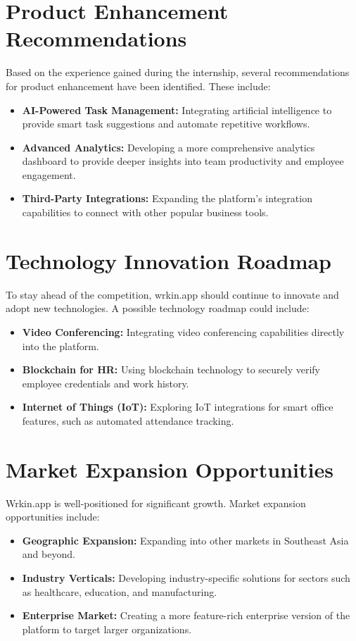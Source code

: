 \section{Product Enhancement Recommendations}
Based on the experience gained during the internship, several recommendations for product enhancement have been identified. These include:
\begin{itemize}
    \item \textbf{AI-Powered Task Management:} Integrating artificial intelligence to provide smart task suggestions and automate repetitive workflows.
    \item \textbf{Advanced Analytics:} Developing a more comprehensive analytics dashboard to provide deeper insights into team productivity and employee engagement.
    \item \textbf{Third-Party Integrations:} Expanding the platform's integration capabilities to connect with other popular business tools.
\end{itemize}

\section{Technology Innovation Roadmap}
To stay ahead of the competition, wrkin.app should continue to innovate and adopt new technologies. A possible technology roadmap could include:
\begin{itemize}
    \item \textbf{Video Conferencing:} Integrating video conferencing capabilities directly into the platform.
    \item \textbf{Blockchain for HR:} Using blockchain technology to securely verify employee credentials and work history.
    \item \textbf{Internet of Things (IoT):} Exploring IoT integrations for smart office features, such as automated attendance tracking.
\end{itemize}

\section{Market Expansion Opportunities}
Wrkin.app is well-positioned for significant growth. Market expansion opportunities include:
\begin{itemize}
    \item \textbf{Geographic Expansion:} Expanding into other markets in Southeast Asia and beyond.
    \item \textbf{Industry Verticals:} Developing industry-specific solutions for sectors such as healthcare, education, and manufacturing.
    \item \textbf{Enterprise Market:} Creating a more feature-rich enterprise version of the platform to target larger organizations.
\end{itemize}

